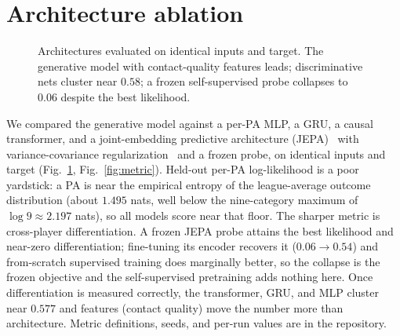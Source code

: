\documentclass[10pt,twocolumn]{article}
\begin{document}
\appendix
\section{Architecture ablation}
\label{app:arch}

\begin{figure}[t]
\centering
{}
\caption{Architectures evaluated on identical inputs and target. The generative model with
contact-quality features leads; discriminative nets cluster near $0.58$; a frozen self-supervised probe
collapses to $0.06$ despite the best likelihood.}
\label{fig:arch}
\end{figure}

We compared the generative model against a per-PA MLP, a GRU, a causal transformer, and a
joint-embedding predictive architecture (JEPA)~\cite{lecun,assran} with variance-covariance
regularization~\cite{bardes} and a frozen probe, on identical inputs and target
(Fig.~\ref{fig:arch}, Fig.~\ref{fig:metric}). Held-out per-PA log-likelihood is a poor yardstick: a PA
is near the empirical entropy of the league-average outcome distribution (about $1.495$ nats, well below
the nine-category maximum of $\log 9\approx2.197$ nats), so all models score near that floor. The
sharper metric is cross-player differentiation. A frozen JEPA probe attains the best likelihood and
near-zero differentiation; fine-tuning its encoder recovers it ($0.06\!\to\!0.54$) and from-scratch
supervised training does marginally better, so the collapse is the frozen objective and the
self-supervised pretraining adds nothing here. Once differentiation is measured correctly, the
transformer, GRU, and MLP cluster near $0.577$ and features (contact quality) move the number more than
architecture. Metric definitions, seeds, and per-run values are in the repository.
\end{document}
